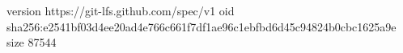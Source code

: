 version https://git-lfs.github.com/spec/v1
oid sha256:e2541bf03d4ee20ad4e766c661f7df1ae96c1ebfbd6d45c94824b0cbc1625a9e
size 87544
